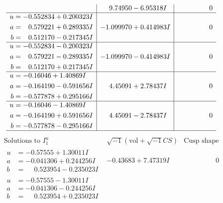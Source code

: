 \documentclass[1p]{elsarticle_modified}
\theoremstyle{definition}
\newcommand{\I}{\sqrt{-1}}
\begin{document}
$$\begin{array}{c|c|c}
 & \phantom{-}9.74950 - 6.95318 I & \phantom{-0.000000 } 0 \\ \hline\begin{aligned}
u &= -0.552834 + 0.200323 I \\
a &= \phantom{-}0.579221 + 0.289335 I \\
b &= \phantom{-}0.512170 - 0.217345 I\end{aligned}
 & -1.099970 + 0.414983 I & \phantom{-0.000000 } 0 \\ \hline\begin{aligned}
u &= -0.552834 - 0.200323 I \\
a &= \phantom{-}0.579221 - 0.289335 I \\
b &= \phantom{-}0.512170 + 0.217345 I\end{aligned}
 & -1.099970 - 0.414983 I & \phantom{-0.000000 } 0 \\ \hline\begin{aligned}
u &= -0.16046 + 1.40869 I \\
a &= -0.164190 - 0.591656 I \\
b &= -0.577878 + 0.295166 I\end{aligned}
 & \phantom{-}4.45091 + 2.78437 I & \phantom{-0.000000 } 0 \\ \hline\begin{aligned}
u &= -0.16046 - 1.40869 I \\
a &= -0.164190 + 0.591656 I \\
b &= -0.577878 - 0.295166 I\end{aligned}
 & \phantom{-}4.45091 - 2.78437 I & \phantom{-0.000000 } 0\\
 \hline 
 \end{array}$$\newpage$$\begin{array}{c|c|c}  
\text{Solutions to }I^u_{1}& \I (\text{vol} + \sqrt{-1}CS) & \text{Cusp shape}\\
 \hline 
\begin{aligned}
u &= -0.57555 + 1.30011 I \\
a &= -0.041306 + 0.244256 I \\
b &= \phantom{-}0.523954 - 0.235023 I\end{aligned}
 & -0.43683 + 7.47319 I & \phantom{-0.000000 } 0 \\ \hline\begin{aligned}
u &= -0.57555 - 1.30011 I \\
a &= -0.041306 - 0.244256 I \\
b &= \phantom{-}0.523954 + 0.235023 I\end{aligned}

\end{array}$$
\end{document}
